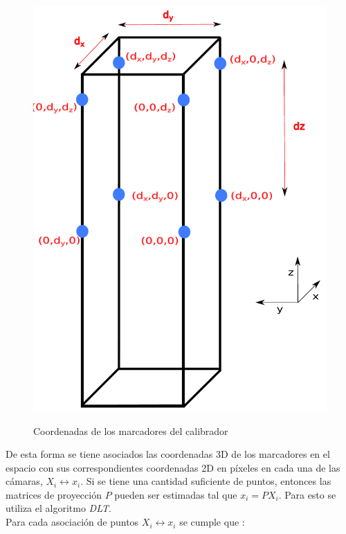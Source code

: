 \begin{figure}[H]
        \centering
     {\includegraphics[scale=0.4]{img/calibracion/medidas_calibrador.pdf}}
    
     \caption{Coordenadas de los marcadores del calibrador}
      \label{fig: medidas_calibrador}     
\end{figure}

   De esta forma se tiene asociados las coordenadas 3D de los marcadores en el espacio con sus correspondientes coordenadas 2D en píxeles en cada una de las cámaras, $X_i \leftrightarrow x_i$. Si se tiene una cantidad suficiente de puntos, entonces las matrices de proyección $P$ pueden ser estimadas tal que $x_i=PX_i$. Para esto se utiliza el algoritmo \textit{DLT}.\\
   
   Para cada asociación de puntos $X_i \leftrightarrow x_i$ se cumple que \cite{hartley}:
   
